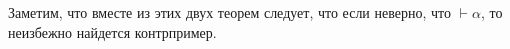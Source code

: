 Заметим, что вместе из этих двух теорем следует, что если неверно, что $\vdash \alpha$,
то неизбежно найдется контрпример.

%
%
%
%
%


